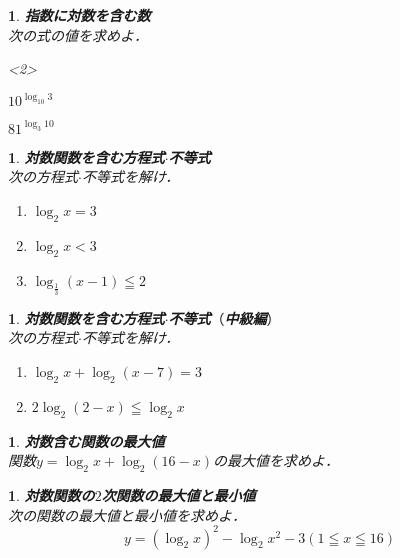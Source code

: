 \documentclass[10pt,
fleqn,
dvipdfmx,
uplatex
]{jsarticle}
\newtheorem{question}[Question]{}
\begin{document}
\begin{question}{\bf\boldmath 指数に対数を含む数}\\
次の式の値を求めよ．
\begin{edaenumerate}<2>
\item ${10}^{\log _{{10}}3}$
\item ${81}^{\log _3{10}}$
\end{edaenumerate}

\end{question}



\begin{question}{\bf\boldmath 対数関数を含む方程式$\cdot$不等式}\\
次の方程式$\cdot$不等式を解け．
\begin{enumerate}
\item $\log _2x=3$
\item $\log _2x<3$
\item $\log _{\frac{1}{3}}\left(x-1\right)\leqq 2$
\end{enumerate}

\end{question}



\begin{question}{\bf\boldmath 対数関数を含む方程式$\cdot$不等式$（$中級編$）$}\\
次の方程式$\cdot$不等式を解け．
\begin{enumerate}
\item $\log _2x+\log _2\left(x-7\right)=3$
\item $2\log _2\left(2-x\right)\leqq \log _2x$
\end{enumerate}

\end{question}



\begin{question}{\bf\boldmath 対数含む関数の最大値}\\
関数$y=\log _2x+\log _2\left({16}-x\right)$の最大値を求めよ．
\end{question}



\begin{question}{\bf\boldmath 対数関数の$2$次関数の最大値と最小値}\\
次の関数の最大値と最小値を求めよ．
\[y=\left(\log _2x\right)^2-\log _2x^2-3\left(1\leqq x\leqq {16}\right)\]
\end{question}
\end{document}
